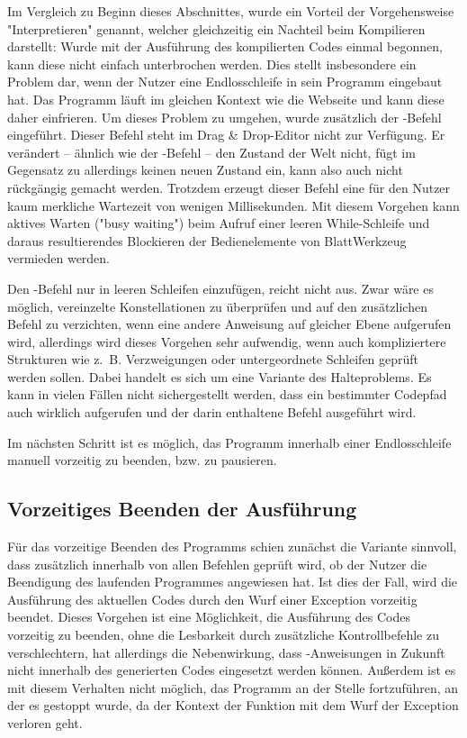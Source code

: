 Im Vergleich zu Beginn dieses Abschnittes, wurde ein Vorteil der Vorgehensweise "Interpretieren" genannt, welcher gleichzeitig ein Nachteil beim Kompilieren darstellt: Wurde mit der Ausführung des kompilierten Codes einmal begonnen, kann diese nicht einfach unterbrochen werden. Dies stellt insbesondere ein Problem dar, wenn der Nutzer eine Endlosschleife in sein Programm eingebaut hat. Das Programm läuft im gleichen Kontext wie die Webseite und kann diese daher einfrieren. Um dieses Problem zu umgehen, wurde zusätzlich der -Befehl eingeführt. Dieser Befehl steht im Drag \& Drop-Editor nicht zur Verfügung. Er verändert -- ähnlich wie der -Befehl -- den Zustand der Welt nicht, fügt im Gegensatz zu  allerdings keinen neuen Zustand ein, kann also auch nicht rückgängig gemacht werden. Trotzdem erzeugt dieser Befehl eine für den Nutzer kaum merkliche Wartezeit von wenigen Millisekunden. Mit diesem Vorgehen kann aktives Warten ("busy waiting") beim Aufruf einer leeren While-Schleife und daraus resultierendes Blockieren der Bedienelemente von BlattWerkzeug vermieden werden.

Den -Befehl nur in leeren Schleifen einzufügen, reicht nicht aus. Zwar wäre es möglich, vereinzelte Konstellationen zu überprüfen und auf den zusätzlichen Befehl zu verzichten, wenn eine andere Anweisung auf gleicher Ebene aufgerufen wird, allerdings wird dieses Vorgehen sehr aufwendig, wenn auch kompliziertere Strukturen wie z.~B. Verzweigungen oder untergeordnete Schleifen geprüft werden sollen. Dabei handelt es sich um eine Variante des Halteproblems. Es kann in vielen Fällen nicht sichergestellt werden, dass ein bestimmter Codepfad auch wirklich aufgerufen und der darin enthaltene Befehl ausgeführt wird.

Im nächsten Schritt ist es möglich, das Programm innerhalb einer Endlosschleife manuell vorzeitig zu beenden, bzw. zu pausieren.

\subsection{Vorzeitiges Beenden der Ausführung}
\label{sec:implementation:evaluation:pause}

Für das vorzeitige Beenden des Programms schien zunächst die Variante sinnvoll, dass zusätzlich innerhalb von allen Befehlen geprüft wird, ob der Nutzer die Beendigung des laufenden Programmes angewiesen hat. Ist dies der Fall, wird die Ausführung des aktuellen Codes durch den Wurf einer Exception vorzeitig beendet. Dieses Vorgehen ist eine Möglichkeit, die Ausführung des Codes vorzeitig zu beenden, ohne die Lesbarkeit durch zusätzliche Kontrollbefehle zu verschlechtern, hat allerdings die Nebenwirkung, dass -Anweisungen in Zukunft nicht innerhalb des generierten Codes eingesetzt werden können. Außerdem ist es mit diesem Verhalten nicht möglich, das Programm an der Stelle fortzuführen, an der es gestoppt wurde, da der Kontext der Funktion mit dem Wurf der Exception verloren geht.

